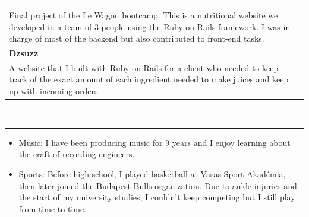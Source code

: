 \documentclass{article}
\begin{document}
\begin{tabular}{l l}
\begin{minipage}{120mm}
        \noindent
        \textbf{Nutri} \\
        Final project of the Le Wagon bootcamp. This is a nutritional website we developed in a team of 3 people using the Ruby on Rails framework. I was in charge of most of the backend but also contributed to front-end tasks.
        \smallskip \\

        \noindent
        \textbf{Dzsuzz} \\
        A website that I built with Ruby on Rails for a client who needed to keep track of the exact amount of each ingredient needed to make juices and keep up with incoming orders. 
    \end{minipage}
\end{tabular}

\vspace{5mm}
\noindent

 \\
\hrule
\bigskip

\begin{itemize}[leftmargin=5mm]
    \item Music: I have been producing music for 9 years and I enjoy learning about the craft of recording engineers.
    \item Sports: Before high school, I played basketball at Vasas Sport Akadémia, then later joined the Budapest Bulls organization. Due to ankle injuries and the start of my university studies, I couldn't keep competing but I still play from time to time.
\end{itemize}
\end{document}
